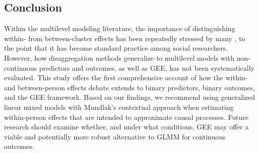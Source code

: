 \subsection{Conclusion}

Within the multilevel modeling literature, the importance of distinguishing within- from between-cluster effects has been repeatedly stressed by many \parencite[e.g.,][]{enders_centering_2007, kreft_effect_1995, raudenbush_hierarchical_2002}, to the point that it has become standard practice among social researchers. However, how disaggregation methods generalize to multilevel models with non-continuous predictors and outcomes, as well as GEE, has not been systematically evaluated. This study offers the first comprehensive account of how the within- and between-person effects debate extends to binary predictors, binary outcomes, and the GEE framework. Based on our findings, we recommend using generalized linear mixed models with Mundlak’s contextual approach when estimating within-person effects that are intended to approximate causal processes. Future research should examine whether, and under what conditions, GEE may offer a viable and potentially more robust alternative to GLMM for continuous outcomes.

\printbibliography







